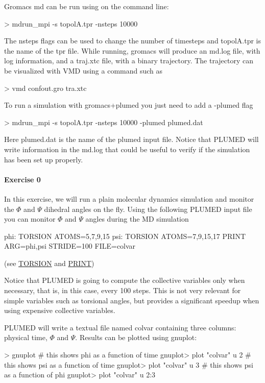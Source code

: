 Gromacs md can be run using on the command line\+: \begin{DoxyVerb}> mdrun_mpi -s topolA.tpr -nsteps 10000
\end{DoxyVerb}
 The nsteps flags can be used to change the number of timesteps and topol\+A.\+tpr is the name of the tpr file. While running, gromacs will produce an md.\+log file, with log information, and a traj.\+xtc file, with a binary trajectory. The trajectory can be visualized with V\+M\+D using a command such as \begin{DoxyVerb}> vmd confout.gro tra.xtc
\end{DoxyVerb}


To run a simulation with gromacs+plumed you just need to add a -\/plumed flag \begin{DoxyVerb}> mdrun_mpi -s topolA.tpr -nsteps 10000 -plumed plumed.dat
\end{DoxyVerb}
 Here plumed.\+dat is the name of the plumed input file. Notice that P\+L\+U\+M\+E\+D will write information in the md.\+log that could be useful to verify if the simulation has been set up properly.\hypertarget{munster_munster-exercise-0}{}\paragraph{Exercise 0}\label{munster_munster-exercise-0}
In this exercise, we will run a plain molecular dynamics simulation and monitor the $\Phi$ and $\Psi$ dihedral angles on the fly. Using the following P\+L\+U\+M\+E\+D input file you can monitor $\Phi$ and $\Psi$ angles during the M\+D simulation \begin{DoxyVerb}phi: TORSION ATOMS=5,7,9,15
psi: TORSION ATOMS=7,9,15,17
PRINT ARG=phi,psi STRIDE=100 FILE=colvar
\end{DoxyVerb}
 (see \hyperlink{TORSION}{T\+O\+R\+S\+I\+O\+N} and \hyperlink{PRINT}{P\+R\+I\+N\+T})

Notice that P\+L\+U\+M\+E\+D is going to compute the collective variables only when necessary, that is, in this case, every 100 steps. This is not very relevant for simple variables such as torsional angles, but provides a significant speedup when using expensive collective variables.

P\+L\+U\+M\+E\+D will write a textual file named {\ttfamily colvar} containing three columns\+: physical time, $\Phi$ and $\Psi$. Results can be plotted using gnuplot\+: \begin{DoxyVerb}> gnuplot
# this shows phi as a function of time
gnuplot> plot "colvar" u 2
# this shows psi as a function of time
gnuplot> plot "colvar" u 3
# this shows psi as a function of phi
gnuplot> plot "colvar" u 2:3
\end{DoxyVerb}


